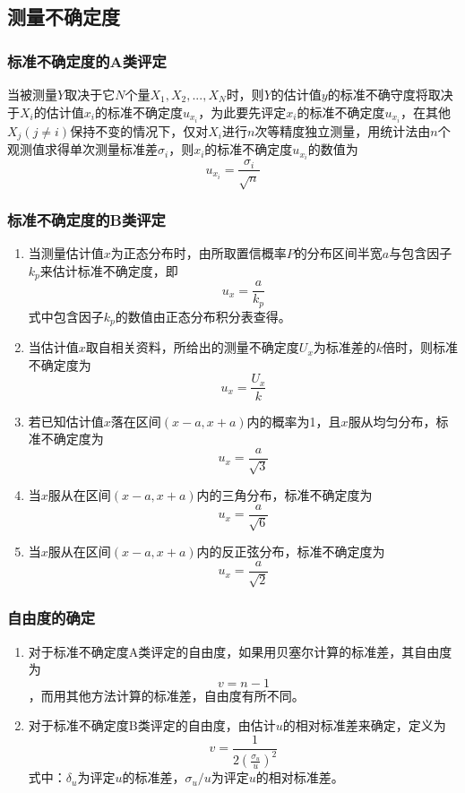 \subsection{测量不确定度}
\subsubsection{标准不确定度的A类评定}
当被测量$ Y $取决于它$ N $个量$ X_1,X_2,...,X_N $时，则$ Y $的估计值$ y $的标准不确守度将取决于$ X_i $的估计值$ x_i $的标准不确定度$ u_{x_i} $，为此要先评定$ x_i $的标准不确定度$ u_{x_i} $，在其他$ X_j(j\neq i) $保持不变的情况下，仅对$ X_i $进行$ n $次等精度独立测量，用统计法由$ n $个观测值求得单次测量标准差$ \sigma_i $，则$ x_i $的标准不确定度$ u_{x_i} $的数值为\[ u_{x_i}=\frac{\sigma_i}{\sqrt{n}} \]
\subsubsection{标准不确定度的B类评定}
\begin{enumerate}
	\item 当测量估计值$ x $为正态分布时，由所取置信概率$ P $的分布区间半宽$ a $与包含因子$ k_p $来估计标准不确定度，即\[ u_x=\frac{a}{k_p} \]
	式中包含因子$ k_p $的数值由正态分布积分表查得。
	\item 当估计值$ x $取自相关资料，所给出的测量不确定度$ U_x $为标准差的$ k $倍时，则标准不确定度为\[ u_x=\frac{U_x}{k} \]
	\item 若已知估计值$ x $落在区间$ (x-a,x+a) $内的概率为1，且$ x $服从均匀分布，标准不确定度为\[ u_x=\frac{a}{\sqrt{3}} \]
	\item 当$ x $服从在区间$ (x-a,x+a) $内的三角分布，标准不确定度为\[ u_x=\frac{a}{\sqrt{6}} \]
	\item 当$ x $服从在区间$ (x-a,x+a) $内的反正弦分布，标准不确定度为\[ u_x=\frac{a}{\sqrt{2}} \]
\end{enumerate}
\subsubsection{自由度的确定}
\begin{enumerate}
	\item 对于标准不确定度A类评定的自由度，如果用贝塞尔计算的标准差，其自由度为\[ v=n-1 \]，而用其他方法计算的标准差，自由度有所不同。
	\item 对于标准不确定度B类评定的自由度，由估计$ u $的相对标准差来确定，定义为\[ v=\frac{1}{2(\frac{\sigma_u}{u})^2} \]
	式中：$ \delta_u $为评定$ u $的标准差，$ \sigma_u/u $为评定$ u $的相对标准差。
\end{enumerate}
